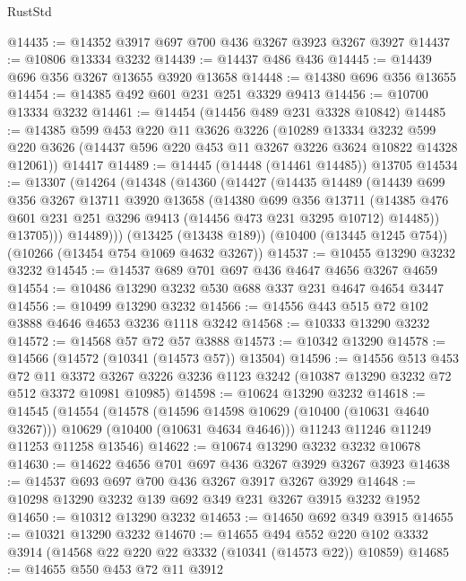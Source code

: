 \begin{lexlean}{RustStd}
\begin{coremodule}
@14435 := @14352 @3917 @697 @700 @436 @3267 @3923 @3267 @3927
@14437 := @10806 @13334 @3232
@14439 := @14437 @486 @436
@14445 := @14439 @696 @356 @3267 @13655 @3920 @13658
@14448 := @14380 @696 @356 @13655
@14454 := @14385 @492 @601 @231 @251 @3329 @9413
@14456 := @10700 @13334 @3232
@14461 := @14454 (@14456 @489 @231 @3328 @10842)
@14485 := @14385
    @599
    @453
    @220
    @11
    @3626
    @3226
    (@10289
      @13334
      @3232
      @599
      @220
      @3626
      (@14437 @596 @220 @453 @11 @3267 @3226 @3624 @10822 @14328 @12061))
    @14417
@14489 := @14445 (@14448 (@14461 @14485)) @13705
@14534 := @13307
    (@14264
      (@14348
        (@14360
          (@14427
            (@14435
              @14489
              (@14439
                @699
                @356
                @3267
                @13711
                @3920
                @13658
                (@14380
                  @699
                  @356
                  @13711
                  (@14385 @476 @601 @231 @251 @3296 @9413 (@14456 @473 @231 @3295 @10712) @14485))
                @13705)))
          @14489)))
    (@13425 (@13438 @189))
    (@10400 (@13445 @1245 @754))
    (@10266 (@13454 @754 @1069 @4632 @3267))
@14537 := @10455 @13290 @3232 @3232
@14545 := @14537 @689 @701 @697 @436 @4647 @4656 @3267 @4659
@14554 := @10486 @13290 @3232 @530 @688 @337 @231 @4647 @4654 @3447
@14556 := @10499 @13290 @3232
@14566 := @14556 @443 @515 @72 @102 @3888 @4646 @4653 @3236 @1118 @3242
@14568 := @10333 @13290 @3232
@14572 := @14568 @57 @72 @57 @3888
@14573 := @10342 @13290
@14578 := @14566 (@14572 (@10341 (@14573 @57)) @13504)
@14596 := @14556
    @513
    @453
    @72
    @11
    @3372
    @3267
    @3226
    @3236
    @1123
    @3242
    (@10387 @13290 @3232 @72 @512 @3372 @10981 @10985)
@14598 := @10624 @13290 @3232
@14618 := @14545
    (@14554
      (@14578
        (@14596 @14598 @10629 (@10400 (@10631 @4640 @3267)))
        @10629
        (@10400 (@10631 @4634 @4646)))
      @11243
      @11246
      @11249
      @11253
      @11258
      @13546)
@14622 := @10674 @13290 @3232 @3232 @10678
@14630 := @14622 @4656 @701 @697 @436 @3267 @3929 @3267 @3923
@14638 := @14537 @693 @697 @700 @436 @3267 @3917 @3267 @3929
@14648 := @10298 @13290 @3232 @139 @692 @349 @231 @3267 @3915 @3232 @1952
@14650 := @10312 @13290 @3232
@14653 := @14650 @692 @349 @3915
@14655 := @10321 @13290 @3232
@14670 := @14655
    @494
    @552
    @220
    @102
    @3332
    @3914
    (@14568 @22 @220 @22 @3332 (@10341 (@14573 @22)) @10859)
@14685 := @14655
    @550
    @453
    @72
    @11
    @3912

\end{coremodule}
\end{lexlean}
